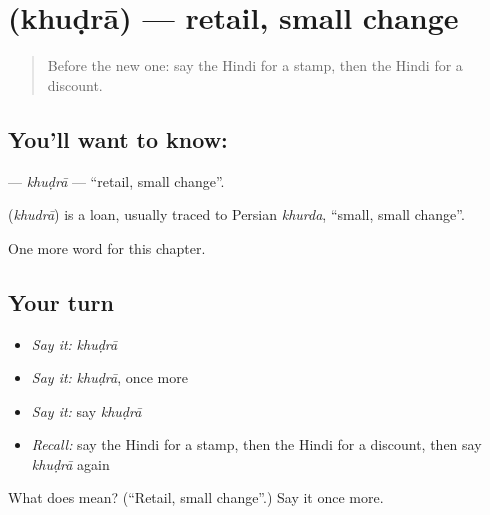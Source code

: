 \section[\texorpdfstring{\hi{खुदरा} (khuḍrā)}{खुदरा (khuḍrā)}]{ (khuḍrā) — retail, small change}

\label{lesson:HI-C250-khudra}



\begin{quote}
Before the new one: say the Hindi for a stamp, then the Hindi for a discount.
\end{quote}

\subsection*{You'll want to know: }
\textbf{} — \emph{khuḍrā} — \textquotedblleft{}retail, small change\textquotedblright{}.

\begin{cousinweb}
\textbf{} (\emph{khudrā}) is a loan, usually traced to Persian \emph{khurda}, \textquotedblleft{}small, small change\textquotedblright{}.
\end{cousinweb}

\begin{grammarlens}[title={What you've built}]
One more word for this chapter.
\end{grammarlens}

\subsection*{Your turn}
\begin{itemize}
\raggedright
  \item \emph{Say it:} \emph{khuḍrā}
  \item \emph{Say it:} \emph{khuḍrā}, once more
  \item \emph{Say it:} say \emph{khuḍrā}
  \item \emph{Recall:} say the Hindi for a stamp, then the Hindi for a discount, then say \emph{khuḍrā} again
\end{itemize}

\begin{tcolorbox}[breakable,colback=teal!4,colframe=teal!35!black,title={Before you move on}]
What does  mean? (\textquotedblleft{}Retail, small change\textquotedblright{}.) Say it once more.
\end{tcolorbox}
